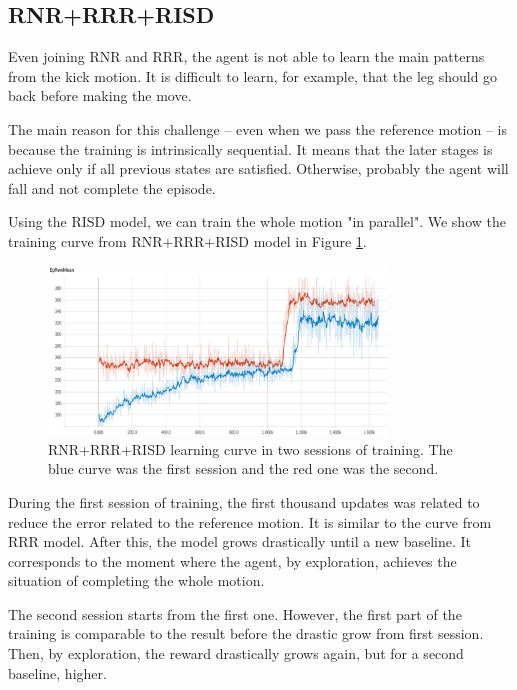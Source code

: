 \subsection{RNR+RRR+RISD}

Even joining RNR and RRR, the agent is not able to learn the main patterns from the kick motion. It is difficult to learn, for example, that the leg should go back before making the move.

The main reason for this challenge -- even when we pass the reference motion -- is because the training is intrinsically sequential. It means that the later stages is achieve only if all previous states are satisfied. Otherwise, probably the agent will fall and not complete the episode.

Using the RISD model, we can train the whole motion "in parallel". We show the training curve from RNR+RRR+RISD model in Figure \ref{fig:rnrrrrrisdcurve}. 

\begin{figure}[!htbp]
	\centering
	\includegraphics[width=0.8\textwidth]{Cap6/rnrrrrrisdcurve.eps}
	\caption{RNR+RRR+RISD learning curve in two sessions of training. The blue curve was the first session and the red one was the second.}
	\label{fig:rnrrrrrisdcurve}
\end{figure}


During the first session of training, the first thousand updates was related to reduce the error related to the reference motion. It is similar to the curve from RRR model. After this, the model grows drastically until a new baseline. It corresponds to the moment where the agent, by exploration, achieves the situation of completing the whole motion.

The second session starts from the first one. However, the first part of the training is comparable to the result before the drastic grow from first session. Then, by exploration, the reward drastically grows again, but for a second baseline, higher.


